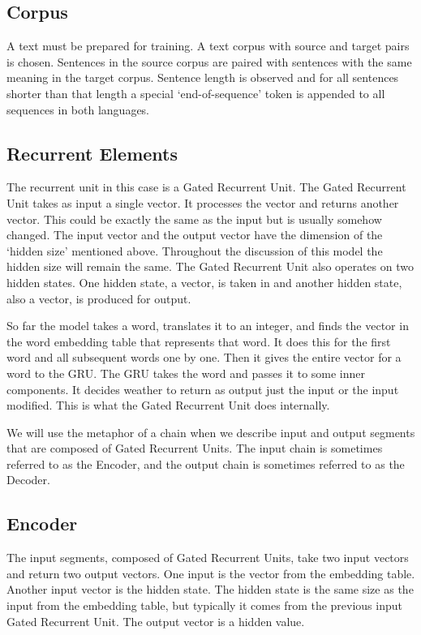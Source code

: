 \subsection*{Corpus}

A text must be prepared for training. A text corpus with source and target pairs is chosen. Sentences in the source corpus are paired with sentences with the same meaning in the target corpus. Sentence length is observed and for all sentences shorter than that length a special `end-of-sequence' token is appended to all sequences in both languages.



\subsection*{Recurrent Elements}
The recurrent unit in this case is a Gated Recurrent Unit. The Gated Recurrent Unit takes as input a single vector. It processes the vector and returns another vector. This could be exactly the same as the input but is usually somehow changed. The input vector and the output vector have the dimension of the `hidden size' mentioned above. Throughout the discussion of this model the hidden size will remain the same. The Gated Recurrent Unit also operates on two hidden states. One hidden state, a vector, is taken in and another hidden state, also a vector, is produced for output.

So far the model takes a word, translates it to an integer, and finds the vector in the word embedding table that represents that word. It does this for the first word and all subsequent words one by one. Then it gives the entire vector for a word to the GRU. The GRU takes the word and passes it to some inner components. It decides weather to return as output just the input or the input modified. This is what the Gated Recurrent Unit does internally.

We will use the metaphor of a chain when we describe input and output segments that are composed of Gated Recurrent Units. The input chain is sometimes referred to as the Encoder, and the output chain is sometimes referred to as the Decoder.

\subsection*{Encoder}

The input segments, composed of Gated Recurrent Units, take two input vectors and return two output vectors. One input is the vector from the embedding table. Another input vector is the hidden state. The hidden state is the same size as the input from the embedding table, but typically it comes from the previous input Gated Recurrent Unit. The output vector is a hidden value.


